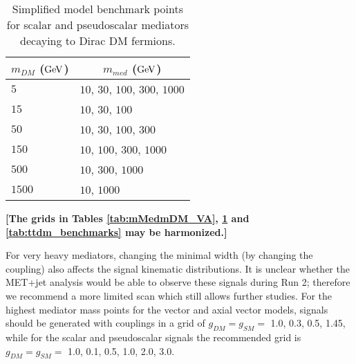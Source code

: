 \documentclass[a4,debug,notitlepage,nobib]{tufte-handout}
\begin{document}
\begin{table}[!ht]
\centering
\begin{tabular}{| l | l |}
\hline
\multicolumn{1}{|c|}{$m_{DM}$ (${\rm GeV}$)} & \multicolumn{1}{c|}{$m_{med}$ (${\rm GeV}$)} \\
\hline
 $5$    & $10$, $30$, $100$, $300$, $1000$\\
 $15$   & $10$, $30$, $100$ \\
 $50$   & $10$, $30$, $100$, $300$ \\
 $150$  & $10$, \hspace{12pt} $100$, $300$, $1000$\\
 $500$  & $10$, \hspace{33pt} $300$, $1000$ \\
 $1500$  &  $10$,\hspace{57pt} $1000$ \\
\hline
\end{tabular}
\caption{Simplified model benchmark points for scalar and pseudoscalar mediators
decaying to Dirac DM fermions.}
\label{tab:mMedmDM_SP}
\end{table}

\textbf{[The grids in Tables \ref{tab:mMedmDM_VA}, \ref{tab:mMedmDM_SP} and 
\ref{tab:ttdm_benchmarks} may be harmonized.]}

For very heavy mediators, changing
the minimal width (by changing the coupling) also affects the signal
kinematic distributions. It is unclear whether the MET+jet analysis
would be able to observe these signals during Run 2; therefore we
recommend a more limited scan which still allows further studies.
For the highest mediator mass points for the vector and axial vector models, 
signals should be generated with couplings in a grid of $g_{DM} = g_{SM} = $ 1.0, 0.3, 0.5, 1.45,
while for the scalar and pseudoscalar signals the recommended grid is
$g_{DM} = g_{SM} = $ 1.0, 0.1, 0.5, 1.0, 2.0, 3.0.



\end{document}
